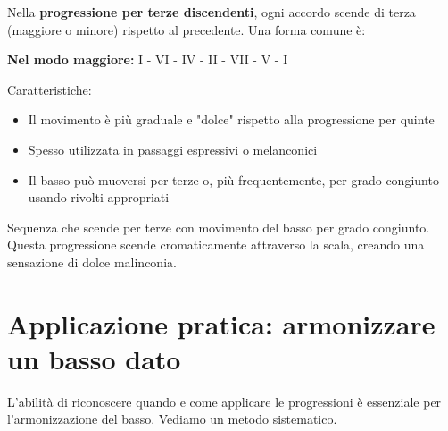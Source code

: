 \begin{regola}
	\label{reg:progressione_terze_disc}
	Nella \textbf{progressione per terze discendenti}, ogni accordo scende di terza (maggiore o minore) rispetto al precedente. Una forma comune è:
	
	\textbf{Nel modo maggiore:}
	I - VI - IV - II - VII - V - I
	
	Caratteristiche:
	\begin{itemize}
		\item Il movimento è più graduale e "dolce" rispetto alla progressione per quinte
		\item Spesso utilizzata in passaggi espressivi o melanconici
		\item Il basso può muoversi per terze o, più frequentemente, per grado congiunto usando rivolti appropriati
	\end{itemize}
\end{regola}

\begin{esempio}
	\label{ex:progressione_terze_disc}
	Sequenza che scende per terze con movimento del basso per grado congiunto.
	Questa progressione scende cromaticamente attraverso la scala, creando una sensazione di dolce malinconia.
\end{esempio}

\section{Applicazione pratica: armonizzare un basso dato}
\label{sec:applicazione_basso_dato}

L'abilità di riconoscere quando e come applicare le progressioni è essenziale per l'armonizzazione del basso. Vediamo un metodo sistematico.

